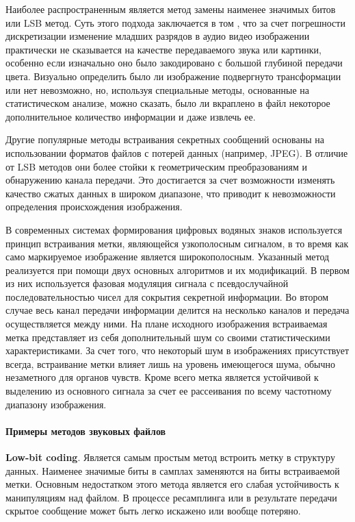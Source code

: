 Наиболее распространенным является метод замены наименее значимых битов или
LSB метод. Суть этого подхода заключается в том , что за счет погрешности
дискретизации изменение младших разрядов в аудио видео изображении
практически не сказывается на качестве передаваемого звука или картинки,
особенно если изначально оно было закодировано с большой глубиной передачи
цвета. Визуально определить было ли изображение подвергнуто трансформации или
нет невозможно, но, используя специальные методы, основанные на
статистическом анализе, можно сказать, было ли вкраплено в файл некоторое
дополнительное количество информации и даже извлечь ее.

Другие популярные методы встраивания секретных сообщений основаны на
использовании форматов файлов с потерей данных (например, JPEG). В отличие от
LSB методов они более стойки к геометрическим преобразованиям и обнаружению
канала передачи. Это достигается за счет возможности изменять качество сжатых
данных в широком диапазоне, что приводит к невозможности определения
происхождения изображения.

В современных системах формирования цифровых водяных знаков используется
принцип встраивания метки, являющейся узкополосным сигналом, в то время как
само маркируемое изображение является широкополосным. Указанный метод
реализуется при помощи двух основных алгоритмов и их модификаций. В первом из
них используется фазовая модуляция сигнала с псевдослучайной
последовательностью чисел для сокрытия секретной информации. Во втором случае
весь канал передачи информации делится на несколько каналов и передача
осуществляется между ними. На плане исходного изображения встраиваемая метка
представляет из себя дополнительный шум со своими статистическими
характеристиками. За счет того, что некоторый шум в изображениях присутствует
всегда, встраивание метки влияет лишь на уровень имеющегося шума, обычно
незаметного для органов чувств. Кроме всего метка является устойчивой к
выделению из основного сигнала за счет ее рассеивания по всему частотному
диапазону изображения.

\paragraph{Примеры методов звуковых файлов}
%
\textbf{Low-bit coding}. Является самым простым метод встроить метку в
структуру данных. Наименее значимые биты в самплах заменяются на биты
встраиваемой метки. Основным недостатком этого метода является его слабая
устойчивость к манипуляциям над файлом. В процессе ресамплинга или в
результате передачи скрытое сообщение может быть легко искажено или вообще
потеряно.

